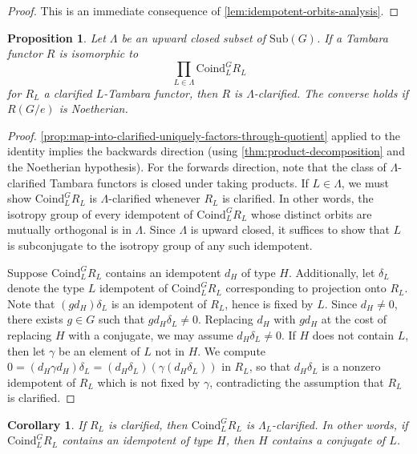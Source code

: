 \documentclass[11pt,dvipsnames]{amsart}
\newtheorem{proposition}[theorem]{Proposition}
\newtheorem{corollary}[theorem]{Corollary}
\theoremstyle{BoldRemark}
\begin{document}
\begin{proof}
	This is an immediate consequence of \cref{lem:idempotent-orbits-analysis}.
\end{proof}

\begin{proposition}\label{prop:characterization-of-lambda-clarified}
	Let $\Lambda$ be an upward closed subset of $\mathrm{Sub}(G)$. If a Tambara functor $R$ is isomorphic to \[ \prod_{L \in \Lambda} \mathrm{Coind}_L^G R_L \] for $R_L$ a clarified $L$-Tambara functor, then $R$ is $\Lambda$-clarified. The converse holds if $R(G/e)$ is Noetherian.
\end{proposition}

\begin{proof}
	\cref{prop:map-into-clarified-uniquely-factors-through-quotient} applied to the identity implies the backwards direction (using \cref{thm:product-decomposition} and the Noetherian hypothesis). For the forwards direction, note that the class of $\Lambda$-clarified Tambara functors is closed under taking products. If $L \in \Lambda$, we must show $\mathrm{Coind}_L^G R_L$ is $\Lambda$-clarified whenever $R_L$ is clarified. In other words, the isotropy group of every idempotent of $\mathrm{Coind}_L^G R_L$ whose distinct orbits are mutually orthogonal is in $\Lambda$. Since $\Lambda$ is upward closed, it suffices to show that $L$ is subconjugate to the isotropy group of any such idempotent.
	
	Suppose $\mathrm{Coind}_L^G R_L$ contains an idempotent $d_H$ of type $H$. Additionally, let $\delta_L$ denote the type $L$ idempotent of $\mathrm{Coind}_L^G R_L$ corresponding to projection onto $R_L$. Note that $(g d_H) \delta_L$ is an idempotent of $R_L$, hence is fixed by $L$. Since $d_H \neq 0$, there exists $g \in G$ such that $g d_H \delta_L \neq 0$. Replacing $d_H$ with $g d_H$ at the cost of replacing $H$ with a conjugate, we may assume $d_H \delta_L \neq 0$. If $H$ does not contain $L$, then let $\gamma$ be an element of $L$ not in $H$. We compute $0 = (d_H \gamma d_H) \delta_L = (d_H \delta_L)(\gamma (d_H \delta_L))$ in $R_L$, so that $d_H \delta_L$ is a nonzero idempotent of $R_L$ which is not fixed by $\gamma$, contradicting the assumption that $R_L$ is clarified.
\end{proof}

\begin{corollary}\label{cor:best-clarification-bound-on-coind-of-clar}
	If $R_L$ is clarified, then $\mathrm{Coind}_L^G R_L$ is $\Lambda_L$-clarified. In other words, if $\mathrm{Coind}_L^G R_L$ contains an idempotent of type $H$, then $H$ contains a conjugate of $L$.
\end{corollary}
\end{document}
